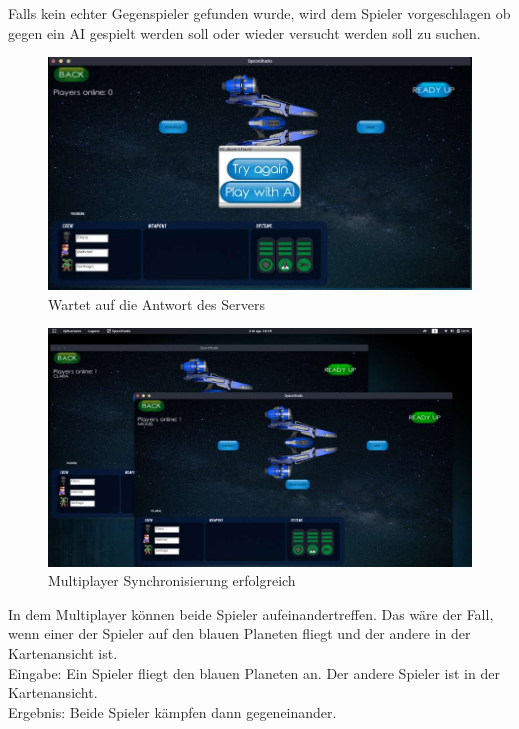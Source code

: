 \documentclass[12pt]{article}
\begin{document}
\clearpage
Falls kein echter Gegenspieler gefunden wurde, wird dem Spieler vorgeschlagen ob gegen ein AI gespielt werden soll oder wieder versucht werden soll zu suchen.
\begin{figure}[htp]
	\centering
	\includegraphics[scale=0.48]{TestProtocolBilder/Multiplayer/3.jpg}
	\caption{Wartet auf die Antwort des Servers}
\end{figure}
\begin{figure}[htp]
	\centering
	\includegraphics[scale=0.4]{TestProtocolBilder/Multiplayer/4.jpg}
	\caption{Multiplayer Synchronisierung erfolgreich}
\end{figure}
\clearpage
In dem Multiplayer können beide Spieler aufeinandertreffen. Das wäre der Fall, wenn einer der Spieler auf den blauen Planeten fliegt und der andere in der Kartenansicht ist.\\
Eingabe: Ein Spieler fliegt den blauen Planeten an. Der andere Spieler ist in der Kartenansicht.\\
Ergebnis: Beide Spieler kämpfen dann gegeneinander.
\end{document}
